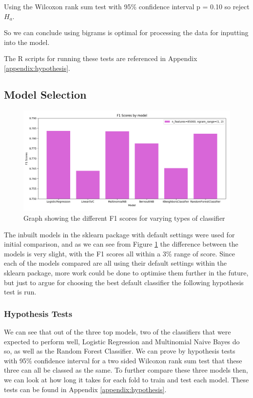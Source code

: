 Using the Wilcoxon rank sum test with 95\% confidence interval p = 0.10 so reject $H_a$.

So we can conclude using bigrams is optimal for processing the data for inputting into the model.

The R scripts for running these tests are referenced in Appendix \ref{appendix:hypothesis}.

\subsection{Model Selection}


\begin{figure}[h]
\centering
\includegraphics[scale=0.5]{graphs/models.png}
\caption{Graph showing the different F1 scores for varying types of classifier}
\label{model:graph}
\end{figure}

The inbuilt models in the sklearn package with default settings were used for initial comparison, and as we can see from Figure \ref{model:graph} the difference between the models is very slight, with the F1 scores all within a 3\% range of score. Since each of the models compared are all using their default settings within the sklearn package, more work could be done to optimise them further in the future, but just to argue for choosing the best default classifier the following hypothesis test is run.

\subsubsection{Hypothesis Tests}

We can see that out of the three top models, two of the classifiers that were expected to perform well, Logistic Regression and Multinomial Naive Bayes do so, as well as the Random Forest Classifier. We can prove by hypothesis tests with 95\% confidence interval for a two sided Wilcoxon rank sum test that these three can all be classed as the same. To further compare these three models then, we can look at how long it takes for each fold to train and test each model. These tests can be found in Appendix \ref{appendix:hypothesis}.

